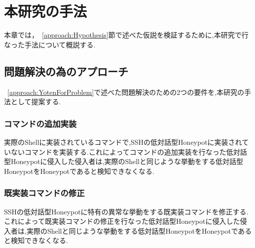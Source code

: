 \chapter{本研究の手法}
\label{method}

本章では，~\ref{approach:Hypothesis}節で述べた仮説を検証するために,本研究で行なった手法について概説する.

\section{問題解決の為のアプローチ}
\label{method:approach}
 ~\ref{approach:YotenForProblem}で述べた問題解決のための2つの要件を,本研究の手法として提案する.

 \subsection{コマンドの追加実装}
実際のShellに実装されているコマンドで,SSHの低対話型Honeypotに実装されていないコマンドを実装する.これによってコマンドの追加実装を行なった低対話型Honeypotに侵入した侵入者は,実際のShellと同じような挙動をする低対話型HoneypotをHoneypotであると検知できなくなる.

 \subsection{既実装コマンドの修正}
 SSHの低対話型Honeypotに特有の異常な挙動をする既実装コマンドを修正する.これによって既実装コマンドの修正を行なった低対話型Honeypotに侵入した侵入者は,実際のShellと同じような挙動をする低対話型HoneypotをHoneypotであると検知できなくなる.




